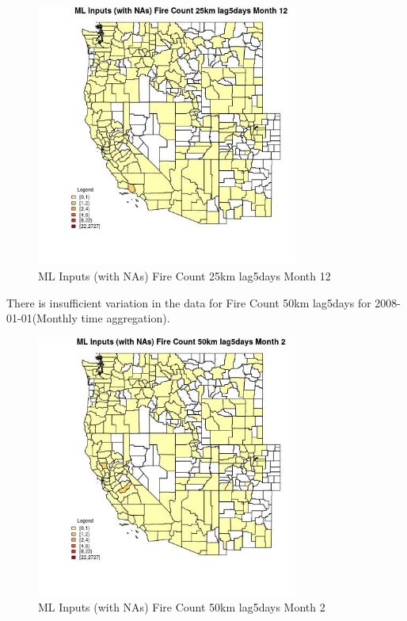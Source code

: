 \begin{figure} 
\centering  
\includegraphics[width=0.77\textwidth]{Code_Outputs/Report_ML_input_PM25_Step4_part_f_de_duplicated_aves_prioritize_24hr_obswNAs_CountyFire_Count_25km_lag5daysmedianMonth12.jpg} 
\caption{\label{fig:Report_ML_input_PM25_Step4_part_f_de_duplicated_aves_prioritize_24hr_obswNAsCountyFire_Count_25km_lag5daysmedianMonth12}ML Inputs (with NAs) Fire Count 25km lag5days Month 12} 
\end{figure} 
 

There is insufficient variation in the data for Fire Count 50km lag5days for 2008-01-01(Monthly time aggregation). 
 

\begin{figure} 
\centering  
\includegraphics[width=0.77\textwidth]{Code_Outputs/Report_ML_input_PM25_Step4_part_f_de_duplicated_aves_prioritize_24hr_obswNAs_CountyFire_Count_50km_lag5daysmedianMonth2.jpg} 
\caption{\label{fig:Report_ML_input_PM25_Step4_part_f_de_duplicated_aves_prioritize_24hr_obswNAsCountyFire_Count_50km_lag5daysmedianMonth2}ML Inputs (with NAs) Fire Count 50km lag5days Month 2} 
\end{figure} 
 

